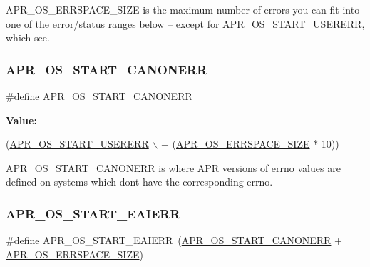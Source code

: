 A\+P\+R\+\_\+\+O\+S\+\_\+\+E\+R\+R\+S\+P\+A\+C\+E\+\_\+\+S\+I\+ZE is the maximum number of errors you can fit into one of the error/status ranges below -- except for A\+P\+R\+\_\+\+O\+S\+\_\+\+S\+T\+A\+R\+T\+\_\+\+U\+S\+E\+R\+E\+RR, which see. \mbox{\label{group__apr__errno_ga7bca957c11b80b31cb54b0d2cbe9e025}} 
\subsubsection{\texorpdfstring{A\+P\+R\+\_\+\+O\+S\+\_\+\+S\+T\+A\+R\+T\+\_\+\+C\+A\+N\+O\+N\+E\+RR}{APR\_OS\_START\_CANONERR}}
{\footnotesize\ttfamily \#define A\+P\+R\+\_\+\+O\+S\+\_\+\+S\+T\+A\+R\+T\+\_\+\+C\+A\+N\+O\+N\+E\+RR}

{\bfseries Value\+:}
\begin{DoxyCode}
(\mbox{\hyperlink{group__apr__errno_gacd35b2de1e38a1fa4717e38d5e153571}{APR\_OS\_START\_USERERR}} \(\backslash\)
                                 + (\mbox{\hyperlink{group__apr__errno_gadb8d97e6836ccdc57b43b6119a5acccf}{APR\_OS\_ERRSPACE\_SIZE}} * 10))
\end{DoxyCode}
A\+P\+R\+\_\+\+O\+S\+\_\+\+S\+T\+A\+R\+T\+\_\+\+C\+A\+N\+O\+N\+E\+RR is where A\+PR versions of errno values are defined on systems which don\textquotesingle{}t have the corresponding errno. \mbox{\label{group__apr__errno_ga2d04991cb57c67a896e22125a1f22b49}} 
\subsubsection{\texorpdfstring{A\+P\+R\+\_\+\+O\+S\+\_\+\+S\+T\+A\+R\+T\+\_\+\+E\+A\+I\+E\+RR}{APR\_OS\_START\_EAIERR}}
{\footnotesize\ttfamily \#define A\+P\+R\+\_\+\+O\+S\+\_\+\+S\+T\+A\+R\+T\+\_\+\+E\+A\+I\+E\+RR~(\mbox{\hyperlink{group__apr__errno_ga7bca957c11b80b31cb54b0d2cbe9e025}{A\+P\+R\+\_\+\+O\+S\+\_\+\+S\+T\+A\+R\+T\+\_\+\+C\+A\+N\+O\+N\+E\+RR}} + \mbox{\hyperlink{group__apr__errno_gadb8d97e6836ccdc57b43b6119a5acccf}{A\+P\+R\+\_\+\+O\+S\+\_\+\+E\+R\+R\+S\+P\+A\+C\+E\+\_\+\+S\+I\+ZE}})}

